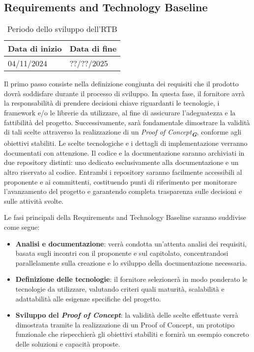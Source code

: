 \subsection{Requirements and Technology Baseline}
\begin{table}[h!]
    \centering
    \renewcommand{\arraystretch}{1.5} %
    \begin{tabularx}{\textwidth}{|X|X|}\hline
    \rowcolor[HTML]{FFD700} 
    \textbf{Data di inizio} & \textbf{Data di fine} \\ \hline
    04/11/2024 & ??/??/2025 \\ \hline
    \end{tabularx}
    \caption{Periodo dello sviluppo dell’RTB}
\end{table}
Il primo passo consiste nella definizione congiunta dei requisiti che il prodotto dovrà soddisfare durante il processo di sviluppo. In questa fase, il fornitore avrà la responsabilità di prendere decisioni chiave riguardanti le tecnologie, i framework e/o le librerie da utilizzare, al fine di assicurare l'adeguatezza e la fattibilità del progetto.
Successivamente, sarà fondamentale dimostrare la validità di tali scelte attraverso la realizzazione di un \emph{Proof of Concept}\textsubscript{\textit{\textbf{G}}}, conforme agli obiettivi stabiliti.
Le scelte tecnologiche e i dettagli di implementazione verranno documentati con attenzione.
Il codice e la documentazione saranno archiviati in due repository distinti: uno dedicato esclusivamente alla documentazione e un altro riservato al codice. Entrambi i repository saranno facilmente accessibili al proponente e ai committenti, costituendo punti di riferimento per monitorare l’avanzamento del progetto e garantendo completa trasparenza sulle decisioni e sulle attività svolte.

Le fasi principali della Requirements and Technology Baseline saranno suddivise come
segue:
\begin{itemize}
\item \textbf{Analisi e documentazione}: verrà condotta un’attenta analisi dei requisiti, basata sugli incontri con il proponente e sul capitolato, concentrandosi parallelamente sulla creazione e lo sviluppo della documentazione necessaria.
\item \textbf{Definizione delle tecnologie}: il fornitore selezionerà in modo ponderato le tecnologie da utilizzare, valutando criteri quali maturità, scalabilità e adattabilità alle esigenze specifiche del progetto.
\item \textbf{Sviluppo del {\emph{Proof of Concept}}}: la validità delle scelte effettuate verrà dimostrata tramite la realizzazione di un Proof of Concept, un prototipo funzionale che rispecchierà gli obiettivi stabiliti e fornirà un esempio concreto delle soluzioni e capacità proposte.
\end{itemize}

